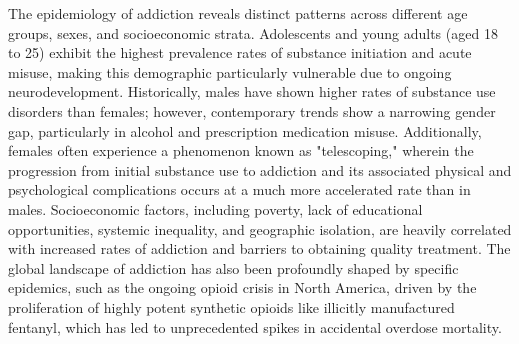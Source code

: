 The epidemiology of addiction reveals distinct patterns across different age groups, sexes, and socioeconomic strata. Adolescents and young adults (aged 18 to 25) exhibit the highest prevalence rates of substance initiation and acute misuse, making this demographic particularly vulnerable due to ongoing neurodevelopment. Historically, males have shown higher rates of substance use disorders than females; however, contemporary trends show a narrowing gender gap, particularly in alcohol and prescription medication misuse. Additionally, females often experience a phenomenon known as "telescoping," wherein the progression from initial substance use to addiction and its associated physical and psychological complications occurs at a much more accelerated rate than in males. Socioeconomic factors, including poverty, lack of educational opportunities, systemic inequality, and geographic isolation, are heavily correlated with increased rates of addiction and barriers to obtaining quality treatment. The global landscape of addiction has also been profoundly shaped by specific epidemics, such as the ongoing opioid crisis in North America, driven by the proliferation of highly potent synthetic opioids like illicitly manufactured fentanyl, which has led to unprecedented spikes in accidental overdose mortality.

